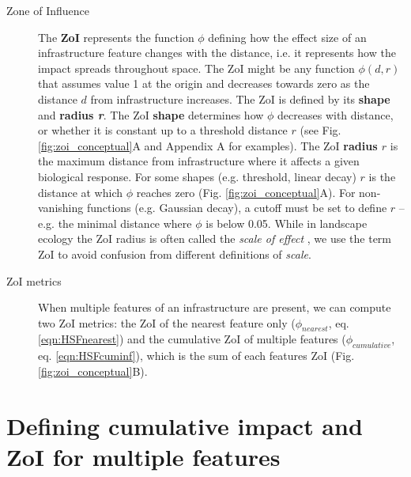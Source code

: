\documentclass[titlepage]{article}
\begin{document}
\begin{tcolorbox}[width=1.3\textwidth,center,colback=yellow!5,colframe=yellow!75!black,title={Box 1 -- Definitions}]
\begin{description}
    \item[Zone of Influence] The \textbf{ZoI} represents the function $\phi$ defining how the effect size of an infrastructure feature changes with the distance, i.e. it represents how the impact spreads throughout space. The ZoI might be any function $\phi(d, r)$ that assumes value 1 at the origin and decreases towards zero as the distance $d$ from infrastructure increases. The ZoI is defined by its \textbf{shape} and \textbf{radius \textit{r}}. The ZoI \textbf{shape} determines how $\phi$ decreases with distance, or whether it is constant up to a threshold distance $r$ (see Fig. \ref{fig:zoi_conceptual}A and Appendix A for examples). The ZoI \textbf{radius $r$} is the maximum distance from infrastructure where it affects a given biological response. For some shapes (e.g. threshold, linear decay) $r$ is the distance at which $\phi$ reaches zero (Fig. \ref{fig:zoi_conceptual}A). For non-vanishing functions (e.g. Gaussian decay), a cutoff must be set to define $r$ -- e.g. the minimal distance where $\phi$ is below 0.05. 
    While in landscape ecology the ZoI radius is often called the \textit{scale of effect} \citep[e.g.][]{jackson_are_2015}, we use the term ZoI to avoid confusion from different definitions of \textit{scale}.
    
    \item[ZoI metrics] When multiple features of an infrastructure are present, we can compute two ZoI metrics: the ZoI of the nearest feature only ($\phi_{nearest}$, eq. \ref{eqn:HSFnearest}) and the cumulative ZoI of multiple features ($\phi_{cumulative}$, eq. \ref{eqn:HSFcuminf}), which is the sum of each features ZoI (Fig. \ref{fig:zoi_conceptual}B).
    

\end{description}
\end{tcolorbox}

\section{Defining cumulative impact and ZoI for multiple features}
\end{document}
